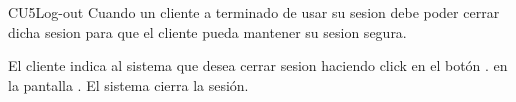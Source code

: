 \begin{UseCase}{CU5}{Log-out}{
	Cuando un cliente a terminado de usar su sesion debe poder cerrar dicha sesion para que el cliente pueda mantener su sesion segura.
}
{\begin{Titemize}
	\end{Titemize}
	}
\end{UseCase}

\begin{UCtrayectoria}
	\UCpaso[] El cliente indica al sistema que desea cerrar sesion haciendo click en el botón . en la pantalla .
	\UCpaso []El sistema cierra la sesión. 
\end{UCtrayectoria}


